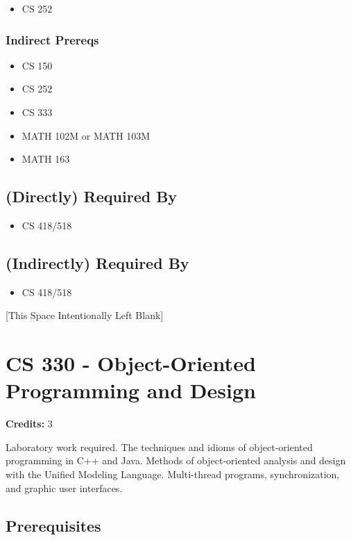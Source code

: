 \documentclass[]{article}
\providecommand{\tightlist}{%
  \setlength{\itemsep}{0pt}\setlength{\parskip}{0pt}}
\newcommand{\pagebreakhere}{
\vspace*{\fill}
\begin{center}
[This Space Intentionally Left Blank]
\end{center}
\vspace*{\fill}
\newpage
}
\begin{document}
\begin{itemize}
\tightlist
\item
  CS 252
\end{itemize}

\subsubsection{Indirect Prereqs}\label{indirect-prereqs-8}

\begin{itemize}
\tightlist
\item
  CS 150
\item
  CS 252
\item
  CS 333
\item
  MATH 102M or MATH 103M
\item
  MATH 163
\end{itemize}

\subsection{(Directly) Required By}\label{directly-required-by-6}

\begin{itemize}
\tightlist
\item
  CS 418/518
\end{itemize}

\subsection{(Indirectly) Required By}\label{indirectly-required-by-6}

\begin{itemize}
\tightlist
\item
  CS 418/518
\end{itemize}

\pagebreakhere
\section{CS 330 - Object-Oriented Programming and
Design}\label{cs-330---object-oriented-programming-and-design}

\textbf{Credits:} 3

Laboratory work required. The techniques and idioms of object-oriented
programming in C++ and Java. Methods of object-oriented analysis and
design with the Unified Modeling Language. Multi-thread programs,
synchronization, and graphic user interfaces.

\subsection{Prerequisites}\label{prerequisites-14}
\end{document}
